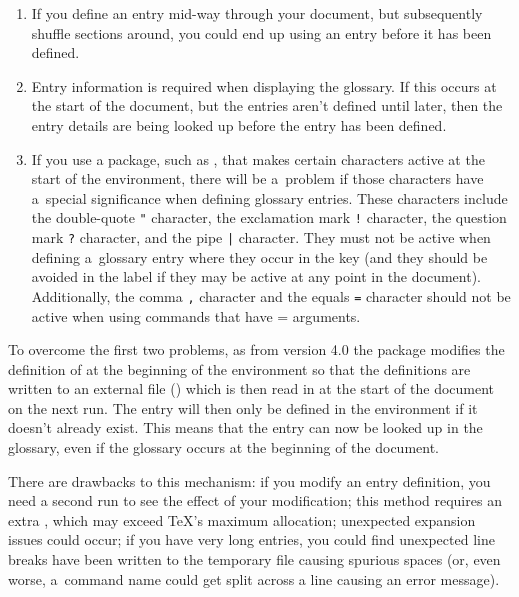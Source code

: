\documentclass[report,inlinetitle]{nlctdoc}
\newcommand*{\gloskey}[2][newglossaryentry]{\csopt{#1}{#2}}
\begin{document}
\begin{enumerate}
 \item If you define an entry mid-way through your document, but
subsequently shuffle sections around, you could end up using an
entry before it has been defined.

 \item Entry information is required when displaying the glossary.
If this occurs at the start of the document, but the entries aren't
defined until later, then the entry details are
being looked up before the entry has been defined.

 \item If you use a package, such as , that makes
certain characters active at the start of the 
environment, there will be a~problem if those characters have
a~special significance when defining glossary entries.
These characters include the double-quote \verb|"| character, the
exclamation mark \texttt{!} character, the question mark \verb|?|
character, and the pipe \verb"|" character. They
must not be active when defining a~glossary entry where they occur
in the \gloskey{sort} key (and they should be avoided in the label
if they may be active at any point in the document). Additionally, 
the comma \texttt{,} character and the equals \texttt{=} character
should not be active when using commands that have
= arguments.

\end{enumerate}

To overcome the first two problems, as from version 4.0 the
 package modifies the definition of
 at the beginning of the 
environment so that the definitions are written to an external file
() which is then read in at the start
of the document on the next run. The entry will then only be defined
in the  environment if it doesn't already exist. This
means that the entry can now be looked up in the glossary, even if
the glossary occurs at the beginning of the document.

There are drawbacks to this mechanism: if you modify an entry
definition, you need a second run to see the effect of your
modification; this method requires an extra , which may
exceed \TeX's maximum allocation; unexpected expansion issues could
occur; if you have very long entries, you could find unexpected line
breaks have been written to the temporary file causing spurious
spaces (or, even worse, a~command name could get split across a line
causing an error message).
\end{document}
